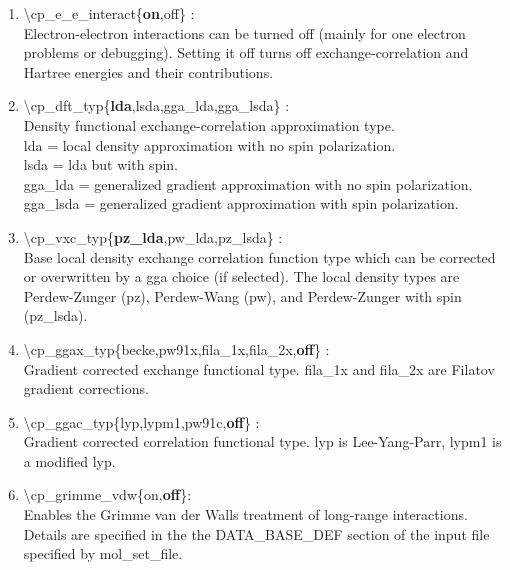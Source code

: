 \documentclass[12pt,titlepage]{article}
\begin{document}
\begin{enumerate}

 \vspace{0.15in} 
 \item  \textbackslash cp\_e\_e\_interact\{{\bf on},off\} : \\
     Electron-electron interactions can be turned off (mainly for  one electron problems or debugging).
     Setting it off turns off exchange-correlation and Hartree energies and their contributions.

 \vspace{0.15in} 
 \item  \textbackslash cp\_dft\_typ\{{\bf lda},lsda,gga\_lda,gga\_lsda\} : \\
     Density functional exchange-correlation approximation type.\\
     lda = local density approximation with no spin polarization.\\
     lsda = lda but with spin.\\
     gga\_lda = generalized gradient approximation with no spin polarization.\\
     gga\_lsda = generalized gradient approximation with  spin polarization.

 \vspace{0.15in} 
 \item  \textbackslash cp\_vxc\_typ\{{\bf pz\_lda},pw\_lda,pz\_lsda\} : \\
     Base local density exchange correlation function type which can be corrected or overwritten by a gga choice (if selected).  The local density types are Perdew-Zunger (pz), Perdew-Wang (pw), and Perdew-Zunger with spin (pz\_lsda).

 \vspace{0.15in} 
 \item  \textbackslash cp\_ggax\_typ\{becke,pw91x,fila\_1x,fila\_2x,{\bf off}\} : \\
     Gradient corrected exchange functional type.  fila\_1x and fila\_2x are Filatov gradient corrections.

 \vspace{0.15in} 
 \item  \textbackslash cp\_ggac\_typ\{lyp,lypm1,pw91c,{\bf off}\} : \\
     Gradient corrected correlation functional type.  lyp is Lee-Yang-Parr, lypm1 is a modified lyp.

 \vspace{0.15in} 
\item \textbackslash cp\_grimme\_vdw\{on,{\bf off}\}:\\
Enables the Grimme van der Walls treatment of long-range interactions.  Details are specified in the the DATA\_BASE\_DEF section of the input file specified by mol\_set\_file.


\end{enumerate}
\end{document}
